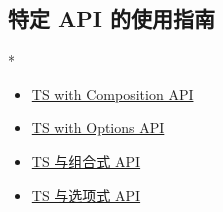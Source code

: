 \begin{paracol}{2}
\subsection{特定 API 的使用指南}
\switchcolumn[0]*%
\begin{itemize}
\item
  \href{https://vuejs.org/guide/typescript/composition-api.html}{TS with
  Composition API}
\item
  \href{https://vuejs.org/guide/typescript/options-api.html}{TS with
  Options API}
\end{itemize}
\switchcolumn
\begin{itemize}
\item
  \href{https://cn.vuejs.org/guide/typescript/composition-api.html}{TS
  与组合式 API}
\item
  \href{https://cn.vuejs.org/guide/typescript/options-api.html}{TS
  与选项式 API}
\end{itemize}
\end{paracol}

 